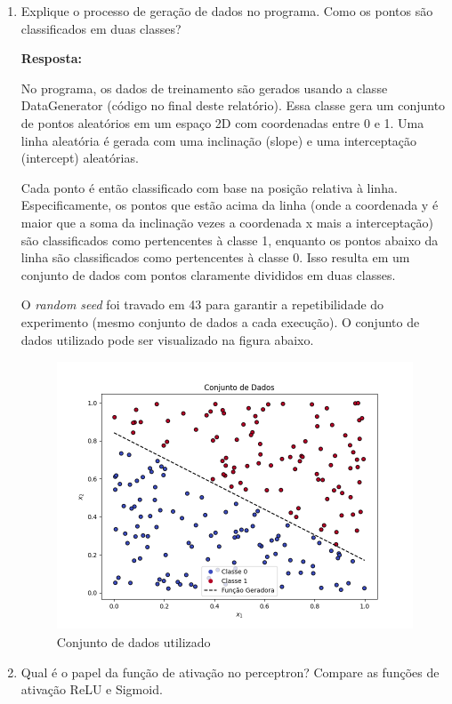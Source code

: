 \documentclass[12 pt]{article}
\begin{document}
\begin{enumerate}
    \item Explique o processo de geração de dados no programa. Como os pontos são classificados em duas classes? \par

    \textbf{Resposta:} \par

    No programa, os dados de treinamento são gerados usando a classe DataGenerator (código no final deste relatório). Essa classe gera um conjunto de pontos aleatórios em um espaço 2D com coordenadas entre 0 e 1. Uma linha aleatória é gerada com uma inclinação (slope) e uma interceptação (intercept) aleatórias.

    Cada ponto é então classificado com base na posição relativa à linha. Especificamente, os pontos que estão acima da linha (onde a coordenada y é maior que a soma da inclinação vezes a coordenada x mais a interceptação) são classificados como pertencentes à classe 1, enquanto os pontos abaixo da linha são classificados como pertencentes à classe 0. Isso resulta em um conjunto de dados com pontos claramente divididos em duas classes.

    O \textit{random seed} foi travado em 43 para garantir a repetibilidade do experimento (mesmo conjunto de dados a cada execução). O conjunto de dados utilizado pode ser visualizado na figura abaixo.

    \begin{figure}[H]
        \caption{Conjunto de dados utilizado}
           \centering
           \includegraphics[height=8cm]{fig/dataset.png}
    \end{figure}
    
    \item Qual é o papel da função de ativação no perceptron? Compare as funções de ativação ReLU e Sigmoid.\par


\end{enumerate}
\end{document}
